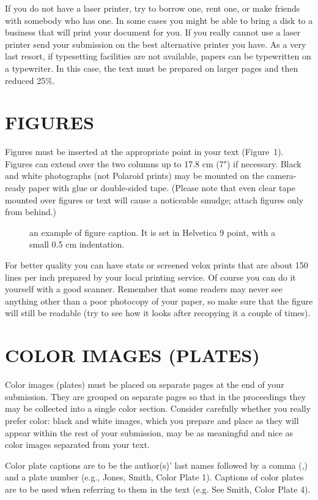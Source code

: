 If you do not have a laser printer, try to borrow one, rent one, or
make friends with somebody who has one.  In some cases you might
be able to bring a disk to a business that will print your document
for you.   If you really cannot use a laser printer send your
submission on the best alternative printer you have.  As a very last
resort, if typesetting facilities are not available, papers can be
typewritten on a typewriter.  In this case, the text must be prepared
on larger pages and then reduced 25\%.

\section{FIGURES}
Figures must be inserted at the appropriate point in your text (Figure~1).
Figures can extend over the two columns up to 17.8 cm (7") if
necessary.  Black and white photographs (not Polaroid prints) may be
mounted on the camera-ready paper with glue or double-sided tape.
(Please note that even clear tape mounted over figures or text will
cause a noticeable smudge; attach figures only from behind.)

\begin{figure}[h]
        \vspace{1.5cm}
        \caption{an example of figure caption.
It is set in Helvetica 9 point, with a small 0.5 cm indentation.}
\end{figure}
For better quality you can have stats or screened velox prints that
are about 150 lines per inch prepared by your local printing service.
Of course you can do it yourself with a good scanner.  Remember that
some readers may never see anything other than a poor photocopy
of your paper, so make sure that the figure will still be readable (try
to see how it looks after recopying it a couple of times).

\section{COLOR IMAGES (PLATES)}
Color images (plates) must be placed on separate pages at the end of
your submission. They are grouped on separate pages so that in the
proceedings they may be collected into a single color section.
Consider carefully whether you really prefer color: black and white
images, which you prepare and place as they will appear within the
rest of your submission, may be as meaningful and nice as color
images separated from your text.

Color plate captions are to be the author(s)' last names followed by a
comma (,) and a plate number (e.g., Jones, Smith, Color Plate 1).
Captions of color plates are to be used when referring to them in the
text (e.g. See Smith, Color Plate 4).

